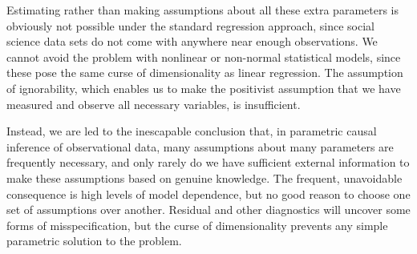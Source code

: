\documentclass[11pt,titlepage]{article}
\begin{document}
Estimating rather than making assumptions about all these extra
parameters is obviously not possible under the standard regression
approach, since social science data sets do not come with anywhere
near enough observations.  We cannot avoid the problem with nonlinear
or non-normal statistical models, since these pose the same curse of
dimensionality as linear regression.  The assumption of ignorability,
which enables us to make the positivist assumption that we have
measured and observe all necessary variables, is insufficient.

Instead, we are led to the inescapable conclusion that, in parametric
causal inference of observational data, many assumptions about many
parameters are frequently necessary, and only rarely do we have
sufficient external information to make these assumptions based on
genuine knowledge.  The frequent, unavoidable consequence is high
levels of model dependence, but no good reason to choose one set of
assumptions over another.  Residual and other diagnostics will uncover
some forms of misspecification, but the curse of dimensionality
prevents any simple parametric solution to the problem.
\end{document}
